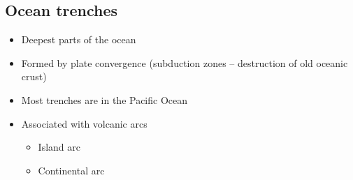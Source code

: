 \subsection{Ocean trenches}

\begin{itemize}
    \item Deepest parts of the ocean
    \item Formed by plate convergence (subduction zones -- destruction of old
        oceanic crust)
    \item Most trenches are in the Pacific Ocean
    \item Associated with volcanic arcs
        \begin{itemize}
            \item Island arc
            \item Continental arc
        \end{itemize}
\end{itemize}


